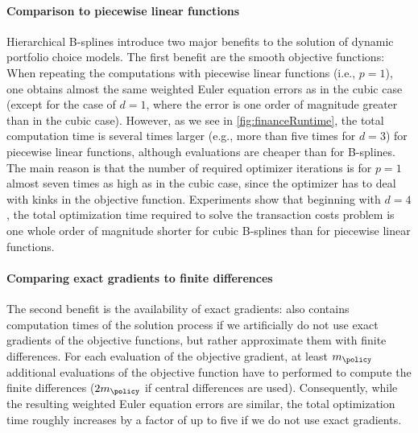 \paragraph{Comparison to piecewise linear functions}


Hierarchical B-splines introduce two major benefits to
the solution of dynamic portfolio choice models.
The first benefit are the smooth objective functions:
When repeating the computations with piecewise linear functions (i.e., $p = 1$),
one obtains almost the same weighted Euler equation errors as in the cubic case
(except for the case of $d = 1$, where the error is one order of
magnitude greater than in the cubic case).
However, as we see in \cref{fig:financeRuntime},
the total computation time is several times larger
(e.g., more than five times for $d = 3$) for piecewise linear functions,
although evaluations are cheaper than for B-splines.
The main reason is that the number of required optimizer iterations
is for $p = 1$ almost seven times as high as in the cubic case,
since the optimizer has to deal with kinks in the objective function.
Experiments show that beginning with $d = 4$,
the total optimization time required to solve the transaction costs problem
is one whole order of magnitude shorter for cubic B-splines
than for piecewise linear functions.

\paragraph{Comparing exact gradients to finite differences}

The second benefit is the availability of exact gradients:
 also contains computation times of the
solution process
if we artificially do not use exact gradients of the objective functions,
but rather approximate them with finite differences.
For each evaluation of the objective gradient,
at least $m_{\policy}$ additional evaluations of the objective function
have to performed to compute the finite differences
($2m_{\policy}$ if central differences are used).
Consequently, while the resulting weighted Euler equation errors are
similar, the total optimization time roughly increases by a
factor of up to five if we do not use exact gradients.
